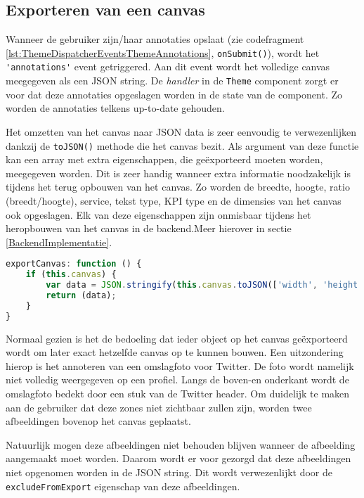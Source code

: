 \subsection{Exporteren van een canvas}
Wanneer de gebruiker zijn/haar annotaties opslaat (zie codefragment \ref{lst:ThemeDispatcherEventsThemeAnnotations}, \lstinline{onSubmit()}), wordt het \lstinline{'annotations'} event getriggered. Aan dit event wordt het volledige canvas meegegeven als een JSON string. De \textit{handler} in de \lstinline{Theme} component zorgt er voor dat deze annotaties opgeslagen worden in de state van de component. Zo worden de annotaties telkens up-to-date gehouden. 

Het omzetten van het canvas naar JSON data is zeer eenvoudig te verwezenlijken dankzij de \lstinline{toJSON()} methode die het canvas bezit. Als argument van deze functie kan een array met extra eigenschappen, die ge\"{e}xporteerd moeten worden, meegegeven worden. Dit is zeer handig wanneer extra informatie noodzakelijk is tijdens het terug opbouwen van het canvas. Zo worden de breedte, hoogte, ratio (breedt/hoogte), service, tekst type, KPI type en de dimensies van het canvas ook opgeslagen. Elk van deze eigenschappen zijn onmisbaar tijdens het heropbouwen van het canvas in de backend.Meer hierover in sectie \ref{BackendImplementatie}. 

\begin{lstlisting}[caption={ThemeAnnotations component - exporteren van het canvas},label=lst:ThemeDispatcherEventsThemeAnnotations,language=javascript]
exportCanvas: function () {
	if (this.canvas) {
		var data = JSON.stringify(this.canvas.toJSON(['width', 'height', 'multiply', 'service', 'textType', 'kpiType', 'dimensions']));
		return (data);
	}
}
\end{lstlisting}

Normaal gezien is het de bedoeling dat ieder object op het canvas ge\"{e}xporteerd wordt om later exact hetzelfde canvas op te kunnen bouwen. Een uitzondering hierop is het annoteren van een omslagfoto voor Twitter. De foto wordt namelijk niet volledig weergegeven op een profiel. Langs de boven-en onderkant wordt de omslagfoto bedekt door een stuk van de Twitter header. Om duidelijk te maken aan de gebruiker dat deze zones niet zichtbaar zullen zijn, worden twee afbeeldingen bovenop het canvas geplaatst. 


Natuurlijk mogen deze afbeeldingen niet behouden blijven wanneer de afbeelding aangemaakt moet worden. Daarom wordt er voor gezorgd dat deze afbeeldingen niet opgenomen worden in de JSON string. Dit wordt verwezenlijkt door de \lstinline{excludeFromExport} eigenschap van deze afbeeldingen.

